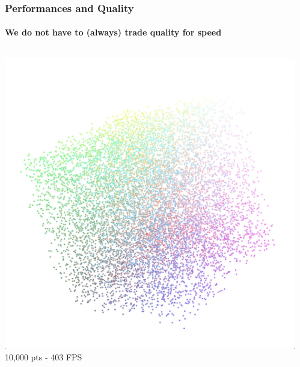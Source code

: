 \documentclass[10pt]{beamer}
\begin{document}
\begin{frame}
  \frametitle{Performances and Quality}
  \framesubtitle{We do not have to (always) trade quality for speed}
  \begin{block}{}
    \begin{columns}
      \begin{column}{.225\textwidth}
        \begin{center}
        \includegraphics[width=\textwidth]{scatter-2}\\
        \tiny 10,000 pts - 403 FPS
        \end{center}
      \end{column}
      \begin{column}{.225\textwidth}
        \begin{center}

\end{center}
\end{column}
\end{columns}
\end{block}
\end{frame}
\end{document}

